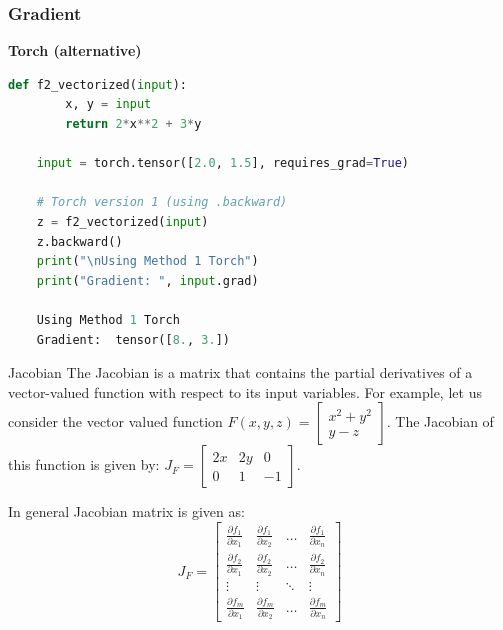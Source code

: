 \documentclass{beamer}
\begin{document}
\begin{frame}[fragile]
    \frametitle{Gradient}

   
        \begin{tcolorbox}
            \textbf{Torch (alternative)}
          
            \begin{lstlisting}[language=Python, linewidth=\textwidth, xleftmargin=-20pt]
    def f2_vectorized(input):
        x, y = input
        return 2*x**2 + 3*y
    
    input = torch.tensor([2.0, 1.5], requires_grad=True)
    
    # Torch version 1 (using .backward)
    z = f2_vectorized(input)
    z.backward()
    print("\nUsing Method 1 Torch")
    print("Gradient: ", input.grad)
    
    Using Method 1 Torch
    Gradient:  tensor([8., 3.])

    \end{lstlisting}
        \end{tcolorbox}
\end{frame}

\begin{frame}{Jacobian}
    The Jacobian is a matrix that contains the partial derivatives of a vector-valued function with respect to its input variables.
    For example, let us consider the vector valued function $F(x, y, z) = \begin{bmatrix} x^2 + y^2 \\ y - z \end{bmatrix}$.
    The Jacobian of this function is given by: $J_F = \begin{bmatrix} 2x & 2y & 0\\ 0 & 1 & -1 \end{bmatrix}$.

    In general Jacobian matrix is given as:
    \begin{equation*}
        J_F = \begin{bmatrix} \frac{\partial f_1}{\partial x_1} & \frac{\partial f_1}{\partial x_2} & \dots & \frac{\partial f_1}{\partial x_n} \\ \frac{\partial f_2}{\partial x_1} & \frac{\partial f_2}{\partial x_2} & \dots & \frac{\partial f_2}{\partial x_n} \\ \vdots & \vdots & \ddots & \vdots \\ \frac{\partial f_m}{\partial x_1} & \frac{\partial f_m}{\partial x_2} & \dots & \frac{\partial f_m}{\partial x_n} \end{bmatrix}
    \end{equation*}

\end{frame}
\end{document}
